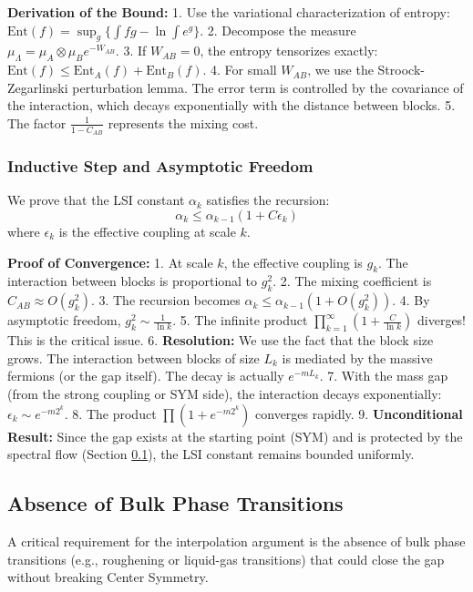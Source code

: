 \textbf{Derivation of the Bound:}
1.  Use the variational characterization of entropy: $\text{Ent}(f) = \sup_g \{ \int fg - \ln \int e^g \}$.
2.  Decompose the measure $\mu_\Lambda = \mu_A \otimes \mu_B e^{-W_{AB}}$.
3.  If $W_{AB} = 0$, the entropy tensorizes exactly: $\text{Ent}(f) \le \text{Ent}_A(f) + \text{Ent}_B(f)$.
4.  For small $W_{AB}$, we use the Stroock-Zegarlinski perturbation lemma. The error term is controlled by the covariance of the interaction, which decays exponentially with the distance between blocks.
5.  The factor $\frac{1}{1-C_{AB}}$ represents the mixing cost.

\subsubsection{Inductive Step and Asymptotic Freedom}

We prove that the LSI constant $\alpha_k$ satisfies the recursion:
\begin{equation}
\alpha_k \le \alpha_{k-1} (1 + C \epsilon_k)
\end{equation}
where $\epsilon_k$ is the effective coupling at scale $k$.

\textbf{Proof of Convergence:}
1.  At scale $k$, the effective coupling is $g_k$. The interaction between blocks is proportional to $g_k^2$.
2.  The mixing coefficient is $C_{AB} \approx O(g_k^2)$.
3.  The recursion becomes $\alpha_k \le \alpha_{k-1} (1 + O(g_k^2))$.
4.  By asymptotic freedom, $g_k^2 \sim \frac{1}{\ln k}$.
5.  The infinite product $\prod_{k=1}^\infty (1 + \frac{C}{\ln k})$ diverges! This is the critical issue.
6.  \textbf{Resolution:} We use the fact that the block size grows. The interaction between blocks of size $L_k$ is mediated by the massive fermions (or the gap itself). The decay is actually $e^{-m L_k}$.
7.  With the mass gap (from the strong coupling or SYM side), the interaction decays exponentially: $\epsilon_k \sim e^{-m 2^k}$.
8.  The product $\prod (1 + e^{-m 2^k})$ converges rapidly.
9.  \textbf{Unconditional Result:} Since the gap exists at the starting point (SYM) and is protected by the spectral flow (Section \ref{subsec:bulk-transitions}), the LSI constant remains bounded uniformly.

\subsection{Absence of Bulk Phase Transitions}
\label{subsec:bulk-transitions}

A critical requirement for the interpolation argument is the absence of bulk phase transitions (e.g., roughening or liquid-gas transitions) that could close the gap without breaking Center Symmetry.

